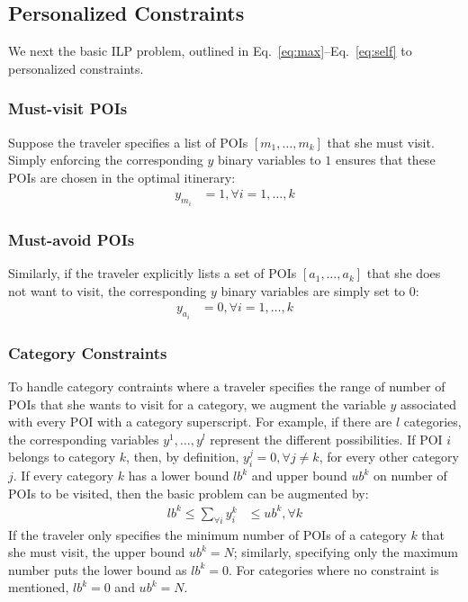 
\subsection{Personalized Constraints}
\label{sec:personalized}

We next the basic ILP problem, outlined in Eq.~\eqref{eq:max}--Eq.~\eqref{eq:self} to personalized constraints.

\subsubsection{Must-visit POIs}
\label{sec:must}

Suppose the traveler specifies a list of POIs $[m_1, \dots, m_k]$ that she
must visit.  Simply enforcing the corresponding $y$ binary variables to
$1$ ensures that these POIs are chosen in the optimal itinerary:
%
\begin{align}
	\label{eq:see}
	y_{m_i} & = 1, \forall i = 1, \dots, k
\end{align}

\subsubsection{Must-avoid POIs}
\label{sec:avoid}

Similarly, if the traveler explicitly lists a set of POIs $[a_1, \dots,
a_k]$ that she does not want to visit, the corresponding $y$ binary
variables are simply set to $0$:
%
\begin{align}
	\label{eq:avoid}
	y_{a_i} & = 0, \forall i = 1, \dots, k
\end{align}

\subsubsection{Category Constraints}
\label{sec:category}

To handle category contraints where a traveler specifies the range of
number of POIs that she wants to visit for a category, we augment the
variable $y$ associated with every POI with a category superscript.  For
example, if there are $l$ categories, the corresponding variables $y^1,
\dots, y^l$ represent the different possibilities.  If POI $i$ belongs to
category $k$, then, by definition, $y^j_i = 0, \forall j \neq k$, for
every other category $j$.  If every category $k$ has a lower bound $lb^k$
and upper bound $ub^k$ on number of POIs to be visited, then the basic
problem can be augmented by:
%
\begin{align}
	\label{eq:category}
	lb^k \leq \sum_{\forall i} y^k_i & \leq ub^k, \forall k
\end{align}
%
If the traveler only specifies the minimum number of POIs of a category
$k$ that she must visit, the upper bound $ub^k = N$; similarly, specifying
only the maximum number puts the lower bound as $lb^k = 0$.  For
categories where no constraint is mentioned, $lb^k = 0$ and $ub^k = N$.

